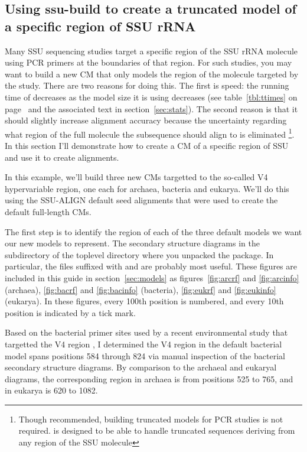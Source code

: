 \subsection{Using ssu-build to create a truncated model of a specific region of SSU rRNA}
\label{sec:tutorial-build-v4}

Many SSU sequencing studies target a specific region of the SSU rRNA
molecule using PCR primers at the boundaries of that region.  For such
studies, you may want to build a new CM that only models the
region of the molecule targeted by the study.
There are two reasons for doing this. The first is speed: the
running time of  decreases as the model size it is
using decreases (see table~\ref{tbl:ttimes} on
page~\pageref{tbl:ttimes} and the associated text in
section~\ref{sec:stats}). The second reason is that 
it should slightly increase alignment accuracy because the uncertainty 
regarding what region of the full molecule the subsequence should
align to is eliminated \footnote{Though
  recommended, building truncated models for PCR studies is not
  required.  is designed to be able to handle
  truncated sequences deriving from any region of the SSU molecule}.
In this section I'll demonstrate how to create a CM of a
specific region of SSU and use it to create alignments.

In this example, we'll build three new CMs targetted to the so-called
V4 hypervariable region, one each for archaea, bacteria and
eukarya. We'll do this using the SSU-ALIGN default seed
alignments that were used to create the default full-length CMs.

The first step is to identify the region of each of the three default
models we want our new models to represent. The secondary structure
diagrams in the  subdirectory of the
 toplevel directory where you unpacked the package.
In particular, the files suffixed with  and
 are probably most useful. These figures are included
in this guide in section~\ref{sec:models} as
figures~\ref{fig:arcrf} and \ref{fig:arcinfo} (archaea),
\ref{fig:bacrf} and \ref{fig:bacinfo} (bacteria),
\ref{fig:eukrf} and \ref{fig:eukinfo} (eukarya).
In these figures, every 100th position is numbered, and every 10th
position is indicated by a tick mark.

Based on the bacterial primer sites used by a recent environmental
study that targetted the V4 region \cite{Claesson09}, I determined 
the V4 region in the default bacterial model spans positions 584
through 824 via manual inspection of the bacterial secondary structure
diagrams. By comparison to the archaeal and eukaryal diagrams, 
the corresponding region in archaea is from positions 525 to
765, and in eukarya is 620 to 1082. 

